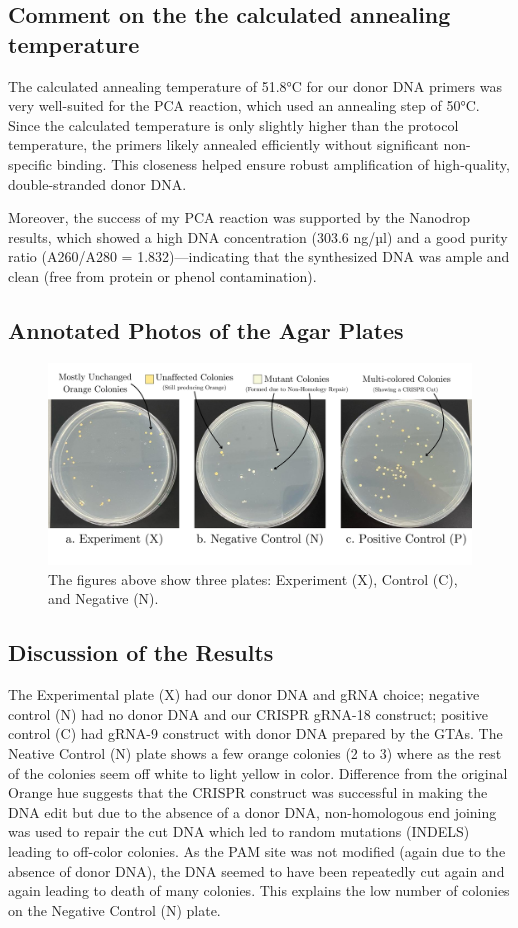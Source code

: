\documentclass[12pt,a4paper]{article}
\begin{document}
\subsection{Comment on the the calculated annealing temperature}
The calculated annealing temperature of 51.8°C for our donor DNA primers was
very well-suited for the PCA reaction, which used an annealing step of 50°C.
Since the calculated temperature is only slightly higher than the protocol
temperature, the primers likely annealed efficiently without significant
non-specific binding. This closeness helped ensure robust amplification of
high-quality, double-stranded donor DNA.

Moreover, the success of my PCA reaction was supported by the Nanodrop results,
which showed a high DNA concentration (303.6 ng/µl) and a good purity ratio
(A260/A280 = 1.832)—indicating that the synthesized DNA was ample and clean
(free from protein or phenol contamination).

\newpage
\subsection{Annotated Photos of the Agar Plates}
\begin{figure}[h]
    \centering
    \includegraphics[width=\textwidth]{figures/exp_3_agar_plates.png}
    \caption{\centering The figures above show three plates: Experiment (X), Control (C), and Negative (N). }\label{fig:exp_3_agar_plates}
\end{figure}

\subsection{Discussion of the Results}
The Experimental plate (X) had our donor DNA and gRNA choice; negative control
(N) had no donor DNA and our CRISPR gRNA-18 construct; positive control (C) had
gRNA-9 construct with donor DNA prepared by the GTAs. The Neative Control (N)
plate shows a few orange colonies (2 to 3) where as the rest of the colonies
seem off white to light yellow in color. Difference from the original Orange
hue suggests that the CRISPR construct was successful in making the DNA edit
but due to the absence of a donor DNA, non-homologous end joining was used to
repair the cut DNA which led to random mutations (INDELS) leading to off-color
colonies. As the PAM site was not modified (again due to the absence of donor
DNA), the DNA seemed to have been repeatedly cut again and again leading to
death of many colonies. This explains the low number of colonies on the
Negative Control (N) plate.
\end{document}
